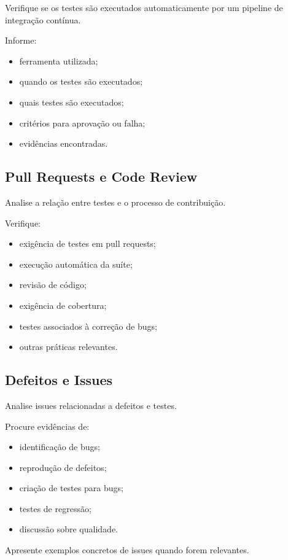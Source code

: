 Verifique se os testes são executados automaticamente por
um pipeline de integração contínua.

Informe:

\begin{itemize}
    \item ferramenta utilizada;
    \item quando os testes são executados;
    \item quais testes são executados;
    \item critérios para aprovação ou falha;
    \item evidências encontradas.
\end{itemize}



\subsection{Pull Requests e Code Review}

Analise a relação entre testes e o processo de contribuição.

Verifique:

\begin{itemize}
    \item exigência de testes em pull requests;
    \item execução automática da suíte;
    \item revisão de código;
    \item exigência de cobertura;
    \item testes associados à correção de bugs;
    \item outras práticas relevantes.
\end{itemize}



\subsection{Defeitos e Issues}

Analise issues relacionadas a defeitos e testes.

Procure evidências de:

\begin{itemize}
    \item identificação de bugs;
    \item reprodução de defeitos;
    \item criação de testes para bugs;
    \item testes de regressão;
    \item discussão sobre qualidade.
\end{itemize}

Apresente exemplos concretos de issues quando forem relevantes.
